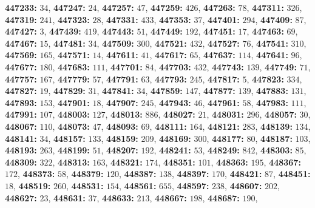 \textsf{\bfseries 447233:} $34$, \textsf{\bfseries 447247:} $24$, \textsf{\bfseries 447257:} $47$, \textsf{\bfseries 447259:} $426$, \textsf{\bfseries 447263:} $78$, \textsf{\bfseries 447311:} $326$, \textsf{\bfseries 447319:} $241$, \textsf{\bfseries 447323:} $28$, \textsf{\bfseries 447331:} $433$, \textsf{\bfseries 447353:} $37$, \textsf{\bfseries 447401:} $294$, \textsf{\bfseries 447409:} $87$, \textsf{\bfseries 447427:} $3$, \textsf{\bfseries 447439:} $419$, \textsf{\bfseries 447443:} $51$, \textsf{\bfseries 447449:} $192$, \textsf{\bfseries 447451:} $17$, \textsf{\bfseries 447463:} $69$, \textsf{\bfseries 447467:} $15$, \textsf{\bfseries 447481:} $34$, \textsf{\bfseries 447509:} $300$, \textsf{\bfseries 447521:} $432$, \textsf{\bfseries 447527:} $76$, \textsf{\bfseries 447541:} $310$, \textsf{\bfseries 447569:} $165$, \textsf{\bfseries 447571:} $14$, \textsf{\bfseries 447611:} $41$, \textsf{\bfseries 447617:} $65$, \textsf{\bfseries 447637:} $114$, \textsf{\bfseries 447641:} $96$, \textsf{\bfseries 447677:} $180$, \textsf{\bfseries 447683:} $111$, \textsf{\bfseries 447701:} $84$, \textsf{\bfseries 447703:} $432$, \textsf{\bfseries 447743:} $139$, \textsf{\bfseries 447749:} $71$, \textsf{\bfseries 447757:} $167$, \textsf{\bfseries 447779:} $57$, \textsf{\bfseries 447791:} $63$, \textsf{\bfseries 447793:} $245$, \textsf{\bfseries 447817:} $5$, \textsf{\bfseries 447823:} $334$, \textsf{\bfseries 447827:} $19$, \textsf{\bfseries 447829:} $31$, \textsf{\bfseries 447841:} $34$, \textsf{\bfseries 447859:} $147$, \textsf{\bfseries 447877:} $139$, \textsf{\bfseries 447883:} $131$, \textsf{\bfseries 447893:} $153$, \textsf{\bfseries 447901:} $18$, \textsf{\bfseries 447907:} $245$, \textsf{\bfseries 447943:} $46$, \textsf{\bfseries 447961:} $58$, \textsf{\bfseries 447983:} $111$, \textsf{\bfseries 447991:} $107$, \textsf{\bfseries 448003:} $127$, \textsf{\bfseries 448013:} $886$, \textsf{\bfseries 448027:} $21$, \textsf{\bfseries 448031:} $296$, \textsf{\bfseries 448057:} $30$, \textsf{\bfseries 448067:} $110$, \textsf{\bfseries 448073:} $47$, \textsf{\bfseries 448093:} $69$, \textsf{\bfseries 448111:} $164$, \textsf{\bfseries 448121:} $283$, \textsf{\bfseries 448139:} $134$, \textsf{\bfseries 448141:} $34$, \textsf{\bfseries 448157:} $133$, \textsf{\bfseries 448159:} $209$, \textsf{\bfseries 448169:} $300$, \textsf{\bfseries 448177:} $80$, \textsf{\bfseries 448187:} $103$, \textsf{\bfseries 448193:} $263$, \textsf{\bfseries 448199:} $51$, \textsf{\bfseries 448207:} $192$, \textsf{\bfseries 448241:} $53$, \textsf{\bfseries 448249:} $842$, \textsf{\bfseries 448303:} $85$, \textsf{\bfseries 448309:} $322$, \textsf{\bfseries 448313:} $163$, \textsf{\bfseries 448321:} $174$, \textsf{\bfseries 448351:} $101$, \textsf{\bfseries 448363:} $195$, \textsf{\bfseries 448367:} $172$, \textsf{\bfseries 448373:} $58$, \textsf{\bfseries 448379:} $120$, \textsf{\bfseries 448387:} $138$, \textsf{\bfseries 448397:} $170$, \textsf{\bfseries 448421:} $87$, \textsf{\bfseries 448451:} $18$, \textsf{\bfseries 448519:} $260$, \textsf{\bfseries 448531:} $154$, \textsf{\bfseries 448561:} $655$, \textsf{\bfseries 448597:} $238$, \textsf{\bfseries 448607:} $202$, \textsf{\bfseries 448627:} $23$, \textsf{\bfseries 448631:} $37$, \textsf{\bfseries 448633:} $213$, \textsf{\bfseries 448667:} $198$, \textsf{\bfseries 448687:} $190$, 
